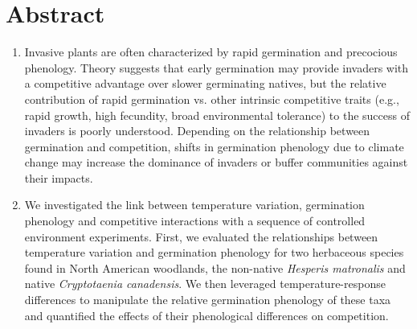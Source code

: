 \documentclass{article}[11pt]
\begin{document}
\section*{Abstract}
\begin{enumerate}
\item Invasive plants are often characterized by rapid germination and precocious phenology. Theory suggests that early germination may provide invaders with a competitive advantage over slower germinating natives, but the relative contribution of rapid germination vs. other intrinsic competitive traits (e.g., rapid growth, high fecundity, broad environmental tolerance) to the success of invaders is poorly understood. Depending on the relationship between germination and competition, shifts in germination phenology due to climate change may increase the dominance of invaders or buffer communities against their impacts. %

\item We investigated the link between temperature variation, germination phenology and competitive interactions with a sequence of controlled environment experiments. First, we evaluated the relationships between temperature variation and germination phenology for two herbaceous species found in North American woodlands, the non-native \textit{Hesperis matronalis} and native \textit{Cryptotaenia canadensis}. We then leveraged temperature-response differences to manipulate the relative germination phenology of these taxa and quantified the effects of their phenological differences on competition.


\end{enumerate}
\end{document}
